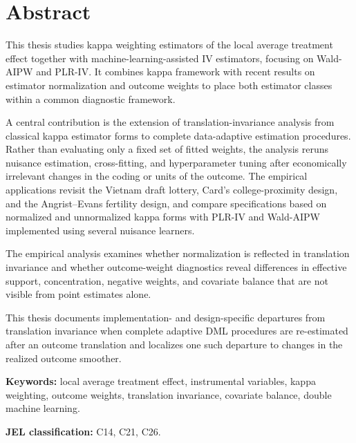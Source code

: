 \documentclass[12pt, a4paper, oneside]{article}
\theoremstyle{plain}
\theoremstyle{definition}
\begin{document}

\newpage
\section*{Abstract}

This thesis studies kappa weighting estimators of the local average treatment effect together with
machine-learning-assisted IV estimators, focusing on Wald-AIPW and PLR-IV. It combines \citet{abadie2003semiparametric} kappa framework with recent results on estimator
normalization and outcome weights to place both estimator classes within a common
diagnostic framework. 

A central contribution is the extension of translation-invariance analysis from
classical kappa estimator forms to complete data-adaptive estimation procedures. Rather than
evaluating only a fixed set of fitted weights, the analysis reruns nuisance estimation,
cross-fitting, and hyperparameter tuning after economically irrelevant changes in the
coding or units of the outcome. The empirical applications revisit the Vietnam draft
lottery, Card's college-proximity design, and the Angrist--Evans fertility design, and
compare specifications based on normalized and unnormalized kappa forms with PLR-IV and Wald-AIPW
implemented using several nuisance learners.

The empirical analysis examines whether normalization is reflected in
translation invariance and whether outcome-weight diagnostics reveal differences
in effective support, concentration, negative weights, and covariate balance that
are not visible from point estimates alone.

This thesis documents implementation- and design-specific departures from translation invariance when complete adaptive DML procedures are re-estimated after an outcome translation and localizes one such departure to changes in the realized outcome smoother.

\bigskip
\noindent\textbf{Keywords:} local average treatment effect, instrumental variables,
kappa weighting, outcome weights, translation invariance, covariate balance,
double machine learning.

\bigskip
\noindent\textbf{JEL classification:} C14, C21, C26.
\newpage
\tableofcontents
\end{document}
